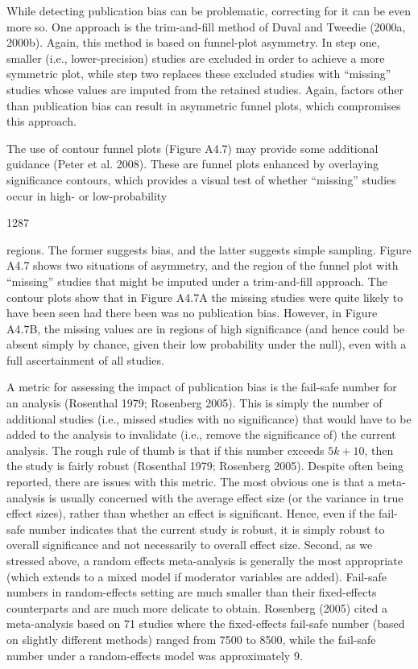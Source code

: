 \documentclass{article}
\begin{document}
While detecting publication bias can be problematic, correcting for it can be even more so. One approach is the trim-and-fill method of Duval and Tweedie (2000a, 2000b). Again, this method is based on funnel-plot asymmetry. In step one, smaller (i.e., lower-precision) studies are excluded in order to achieve a more symmetric plot, while step two replaces these excluded studies with “missing” studies whose values are imputed from the retained studies. Again, factors other than publication bias can result in asymmetric funnel plots, which compromises this approach.

The use of contour funnel plots (Figure A4.7) may provide some additional guidance (Peter et al. 2008). These are funnel plots enhanced by overlaying significance contours, which provides a visual test of whether “missing” studies occur in high- or low-probability

1287

regions. The former suggests bias, and the latter suggests simple sampling. Figure A4.7 shows two situations of asymmetry, and the region of the funnel plot with “missing” studies that might be imputed under a trim-and-fill approach. The contour plots show that in Figure A4.7A the missing studies were quite likely to have been seen had there been was no publication bias. However, in Figure A4.7B, the missing values are in regions of high significance (and hence could be absent simply by chance, given their low probability under the null), even with a full ascertainment of all studies.

A metric for assessing the impact of publication bias is the fail-safe number for an analysis (Rosenthal 1979; Rosenberg 2005). This is simply the number of additional studies (i.e., missed studies with no significance) that would have to be added to the analysis to invalidate (i.e., remove the significance of) the current analysis. The rough rule of thumb is that if this number exceeds  $ 5k+10 $, then the study is fairly robust (Rosenthal 1979; Rosenberg 2005). Despite often being reported, there are issues with this metric. The most obvious one is that a meta-analysis is usually concerned with the average effect size (or the variance in true effect sizes), rather than whether an effect is significant. Hence, even if the fail-safe number indicates that the current study is robust, it is simply robust to overall significance and not necessarily to overall effect size. Second, as we stressed above, a random effects meta-analysis is generally the most appropriate (which extends to a mixed model if moderator variables are added). Fail-safe numbers in random-effects setting are much smaller than their fixed-effects counterparts and are much more delicate to obtain. Rosenberg (2005) cited a meta-analysis based on 71 studies where the fixed-effects fail-safe number (based on slightly different methods) ranged from 7500 to 8500, while the fail-safe number under a random-effects model was approximately 9.
\end{document}
